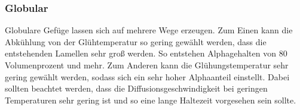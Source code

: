 \documentclass[a4paper, 11pt]{tubsreprt}
\begin{document}
\subsubsection{Globular}
Globulare Gefüge lassen sich auf mehrere Wege erzeugen. Zum Einen kann die Abkühlung von der Glühtemperatur so gering gewählt werden, dass die entstehenden Lamellen sehr groß werden. So entstehen Alphagehalten von 80 Volumenprozent und mehr. Zum Anderen kann die Glühungstemperatur sehr gering gewählt werden, sodass sich ein sehr hoher Alphaanteil einstellt. Dabei sollten beachtet werden, dass die Diffusionsgeschwindigkeit bei geringen Temperaturen sehr gering ist und so eine lange Haltezeit vorgesehen sein sollte. 


\listoffigures
\listoftables
\end{document}
